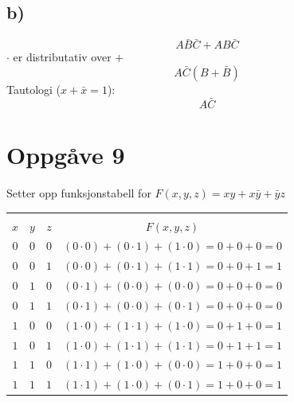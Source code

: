 \documentclass[12pt,a4paper]{article}
\begin{document}
		\subsection{b)}
		\begin{equation}
			A\bar{B}\bar{C} + AB\bar{C}
		\end{equation}
		$\cdot$ er distributativ over $+$
		\begin{equation}
			A\bar{C}(B+\bar{B})
		\end{equation}
		Tautologi ($x+\bar{x}=1$):
		\begin{equation}
			A\bar{C}
		\end{equation}
		
	\section{Oppgåve 9}
		Setter opp funksjonstabell for $F(x,y,z)=xy+x\bar{y}+\bar{y}z$
		\begin{center}
			\begin{tabular}{ |c|c|c|c| }
				\hline
				&&& \\
				$x$	&	$y$	&	$z$	&	$F(x,y,z)$ \\
				\hline
				$0$	&	$0$	&	$0$	&	$(0\cdot0) + (0\cdot1) + (1\cdot0)=0+0+0=0$ \\
				\hline
				$0$	&	$0$	&	$1$	&	$(0\cdot0) + (0\cdot1) + (1\cdot1)=0+0+1=1$ \\
				\hline
				$0$	&	$1$	&	$0$	&	$(0\cdot1) + (0\cdot0) + (0\cdot0)=0+0+0=0$ \\
				\hline
				$0$	&	$1$	&	$1$	&	$(0\cdot1) + (0\cdot0) + (0\cdot1)=0+0+0=0$ \\
				\hline
				$1$	&	$0$	&	$0$	&	$(1\cdot0) + (1\cdot1) + (1\cdot0)=0+1+0=1$ \\
				\hline
				$1$	&	$0$	&	$1$	&	$(1\cdot0) + (1\cdot1) + (1\cdot1)=0+1+1=1$ \\
				\hline
				$1$	&	$1$	&	$0$	&	$(1\cdot1) + (1\cdot0) + (0\cdot0)=1+0+0=1$ \\
				\hline
				$1$	&	$1$	&	$1$	&	$(1\cdot1) + (1\cdot0) + (0\cdot1)=1+0+0=1$ \\
				\hline
			\end{tabular}
		\end{center}
\end{document}
